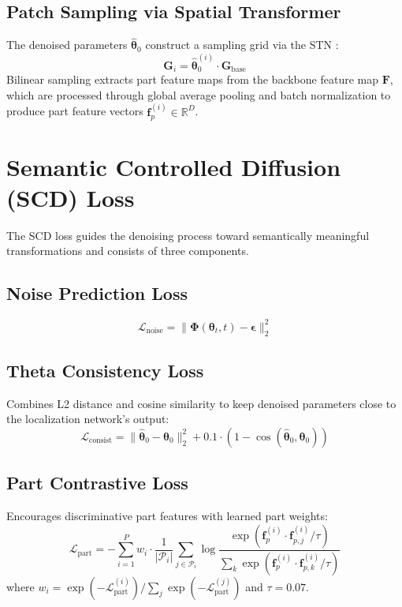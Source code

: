 \subsection{Patch Sampling via Spatial Transformer}

The denoised parameters $\hat{\boldsymbol{\theta}}_0$ construct a sampling grid via the STN \cite{jaderberg2015spatial}:
\begin{equation}
    \mathbf{G}_i = \hat{\boldsymbol{\theta}}_0^{(i)} \cdot \mathbf{G}_{\text{base}}
\end{equation}
Bilinear sampling extracts part feature maps from the backbone feature map $\mathbf{F}$, which are processed through global average pooling and batch normalization to produce part feature vectors $\mathbf{f}_p^{(i)} \in \mathbb{R}^{D}$.

\section{Semantic Controlled Diffusion (SCD) Loss}

The SCD loss guides the denoising process toward semantically meaningful transformations and consists of three components.

\subsection{Noise Prediction Loss}
\begin{equation}
    \mathcal{L}_{\text{noise}} = \|\boldsymbol{\Phi}(\boldsymbol{\theta}_t, t) - \boldsymbol{\epsilon}\|_2^2
\end{equation}

\subsection{Theta Consistency Loss}
Combines L2 distance and cosine similarity to keep denoised parameters close to the localization network's output:
\begin{equation}
    \mathcal{L}_{\text{consist}} = \|\hat{\boldsymbol{\theta}}_0 - \boldsymbol{\theta}_0\|_2^2 + 0.1 \cdot \left(1 - \cos(\hat{\boldsymbol{\theta}}_0, \boldsymbol{\theta}_0)\right)
\end{equation}

\subsection{Part Contrastive Loss}
Encourages discriminative part features with learned part weights:
\begin{equation}
    \mathcal{L}_{\text{part}} = -\sum_{i=1}^{P} w_i \cdot \frac{1}{|\mathcal{P}_i|} \sum_{j \in \mathcal{P}_i} \log \frac{\exp(\mathbf{f}_p^{(i)} \cdot \mathbf{f}_{p,j}^{(i)} / \tau)}{\sum_k \exp(\mathbf{f}_p^{(i)} \cdot \mathbf{f}_{p,k}^{(i)} / \tau)}
\end{equation}
where $w_i = \exp(-\mathcal{L}_{\text{part}}^{(i)}) / \sum_j \exp(-\mathcal{L}_{\text{part}}^{(j)})$ and $\tau = 0.07$.

